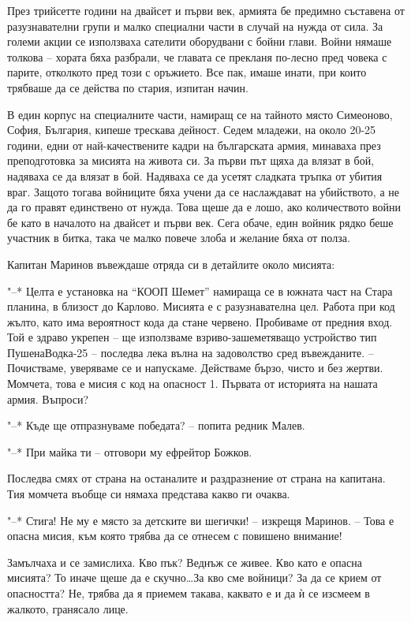 \documentclass[ebook,openany,12pt]{memoir}
\begin{document}
През трийсетте години на двайсет и първи век, армията бе предимно съставена от разузнавателни групи и малко специални части в случай на нужда от сила. За големи акции се използваха сателити оборудвани с бойни глави. Войни нямаше толкова – хората бяха разбрали, че главата се прекланя по-лесно пред човека с парите, отколкото пред този с оръжието. Все пак, имаше инати, при които трябваше да се действа по стария, изпитан начин. 

В един корпус на специалните части, намиращ се на тайното място Симеоново, София, България, кипеше трескава дейност. Седем младежи, на около 20-25 години, едни от най-качествените кадри на българската армия, минаваха през преподготовка за мисията на живота си. За първи път щяха да влязат в бой, надяваха се да влязат в бой. Надяваха се да усетят сладката тръпка от убития враг. Защото тогава войниците бяха учени да се наслаждават на убийството, а не да го правят единствено от нужда. Това щеше да е лошо, ако количеството войни бе като в началото на двайсет и първи век. Сега обаче, един войник рядко беше участник в битка, така че малко повече злоба и желание бяха от полза.

Капитан Маринов въвеждаше отряда си в детайлите около мисията:

"--* Целта е установка на ``КООП Шемет'' намираща се в южната част на Стара планина, в близост до Карлово. Мисията е с разузнавателна цел. Работа при код жълто, като има вероятност кода да стане червено. Пробиваме от предния вход. Той е здраво укрепен – ще използваме взриво-зашеметяващо устройство тип ПушенаВодка-25 – последва лека вълна на задоволство сред въвежданите. – Почистваме, уверяваме се и напускаме. Действаме бързо, чисто и без жертви. Момчета, това е мисия с код на опасност 1. Първата от историята на нашата армия. Въпроси?

"--* Къде ще отпразнуваме победата? – попита редник Малев.

"--* При майка ти – отговори му ефрейтор Божков. 

Последва смях от страна на останалите и раздразнение от страна на капитана. Тия момчета въобще си нямаха представа какво ги очаква.

"--* Стига! Не му е място за детските ви шегички! – изкрещя Маринов. – Това е опасна мисия, към която трябва да се отнесем с повишено внимание!

Замълчаха и се замислиха. Кво пък? Веднъж се живее. Кво като е опасна мисията? То иначе щеше да е скучно\ldots За кво сме войници? За да се крием от опасността? Не, трябва да я приемем такава, каквато е и да ѝ се изсмеем в жалкото, гранясало лице.
\end{document}
